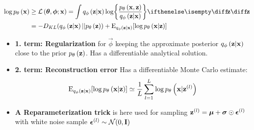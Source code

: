 \begin{itemize}
		\begin{gather}
			\begin{split}
				\log \dec{\vec{x}} & \ge \mathcal{L}\left(\vec{\theta},\vec{\phi};\vec{x}\right) =
				\int \enc{\vec{z}|\vec{x}} \log \curlies*{ \frac{\dec{\vec{x},\vec{z}}}{\enc{\vec{z}|\vec{x}} } } \D{\vec{z}} \\
				& = -D_{KL}\parens{ \enc{\vec{z}|\vec{x}}||\dec{\vec{z}} } + \E_{\enc{\vec{z}|\vec{x}}} \brackets{\log \dec{\vec{x}|\vec{z}} }
			\end{split}
		\end{gather}
	\begin{itemize}
		\item \textbf{1. term: Regularization} for $\vec{\phi}$ keeping the approximate posterior $q_{\phi}\left(\bm{\mathrm{z}}|\bm{\mathrm{x}}\right)$ close to the prior $p_{\theta}\left(\bm{\mathrm{z}}\right)$. Has a differentiable analytical solution.
		\item \textbf{2. term: Reconstruction error} Has a differentiable Monte Carlo estimate:
		\begin{equation}
			\operatorname{E}_{q_{\phi}\left(\bm{\mathrm{z}}|\bm{\mathrm{x}}\right)} [\log p_{\theta}\left(\bm{\mathrm{x}}|\bm{\mathrm{z}}\right) ] \simeq \frac{1}{L}\sum^L_{l=1} \log p_{\theta}\left(\bm{\mathrm{x}}|\bm{\mathrm{z}}^{(l)}\right)
		\end{equation}
		\item \textbf{A Reparameterization trick} is here used for sampling $\bm{\mathrm{z}}^{(l)}= \bm{\mathrm{\mu}} + \bm{\mathrm{\sigma}} \odot \bm{\mathrm{\epsilon}}^{(l)}$ with white noise sample $\bm{\mathrm{\epsilon}}^{(l)} \sim \mathcal{N}(0,\bm{\mathrm{I}})$
		\end{itemize}
	
\end{itemize}







